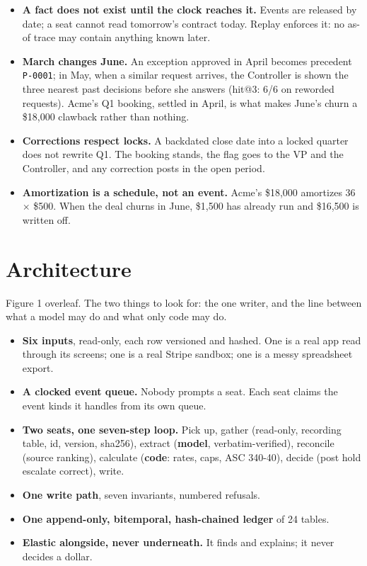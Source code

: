 \documentclass[10pt,a4paper]{article}
\newcommand{\gy}[1]{{\color{qgrey}#1}}
\newcommand{\code}[1]{{\small\texttt{#1}}}
\newcommand{\lead}[1]{{\color{qgrey}\small #1}}
\begin{document}
\begin{itemize}
\item \textbf{A fact does not exist until the clock reaches it.} Events are released by date; a seat cannot read tomorrow's contract today. Replay enforces it: no as-of trace may contain anything known later.
\item \textbf{March changes June.} An exception approved in April becomes precedent \code{P-0001}; in May, when a similar request arrives, the Controller is shown the three nearest past decisions before she answers \gy{(hit@3: 6/6 on reworded requests)}. Acme's Q1 booking, settled in April, is what makes June's churn a \$18{,}000 clawback rather than nothing.
\item \textbf{Corrections respect locks.} A backdated close date into a locked quarter does not rewrite Q1. The booking stands, the flag goes to the VP and the Controller, and any correction posts in the open period.
\item \textbf{Amortization is a schedule, not an event.} Acme's \$18{,}000 amortizes 36 $\times$ \$500. When the deal churns in June, \$1{,}500 has already run and \$16{,}500 is written off.
\end{itemize}

\section{Architecture}

\lead{Figure 1 overleaf. The two things to look for: the one writer, and the line between what a model may do and what only code may do.}

\begin{itemize}
\item \textbf{Six inputs}, read-only, each row versioned and hashed. One is a real app read through its screens; one is a real Stripe sandbox; one is a messy spreadsheet export.
\item \textbf{A clocked event queue.} Nobody prompts a seat. Each seat claims the event kinds it handles from its own queue.
\item \textbf{Two seats, one seven-step loop.} Pick up, gather \gy{(read-only, recording table, id, version, sha256)}, extract \gy{(\textbf{model}, verbatim-verified)}, reconcile \gy{(source ranking)}, calculate \gy{(\textbf{code}: rates, caps, ASC 340-40)}, decide \gy{(post \textbar{} hold \textbar{} escalate \textbar{} correct)}, write.
\item \textbf{One write path}, seven invariants, numbered refusals.
\item \textbf{One append-only, bitemporal, hash-chained ledger} of 24 tables.
\item \textbf{Elastic alongside, never underneath.} It finds and explains; it never decides a dollar.
\end{itemize}
\end{document}
